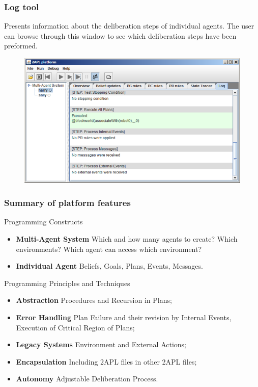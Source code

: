 	\begin{frame}
		\frametitle{Log tool}
		Presents information about the deliberation steps of individual agents. The user can browse through this window to see which deliberation steps have been preformed.
		
		\begin{figure}
			\includegraphics[width=0.65\linewidth]{images/2APLLog.png}
		\end{figure}
	\end{frame}
	
	\begin{frame}
		\frametitle{Summary of platform features}
		Programming Constructs
		\begin{itemize}
			\item \textbf{Multi-Agent System} Which and how many agents to create? Which environments? Which agent can access which environment?
			\item \textbf{Individual Agent} Beliefs, Goals, Plans, Events, Messages.
		\end{itemize}
		
		Programming Principles and Techniques
		\begin{itemize}
			\item \textbf{Abstraction} Procedures and Recursion in Plans;
			\item \textbf{Error Handling} Plan Failure and their revision by Internal Events, Execution of Critical Region of Plans;
			\item \textbf{Legacy Systems} Environment and External Actions;
			\item \textbf{Encapsulation} Including 2APL files in other 2APL files;
			\item \textbf{Autonomy} Adjustable Deliberation Process.
		\end{itemize}
		
	\end{frame}